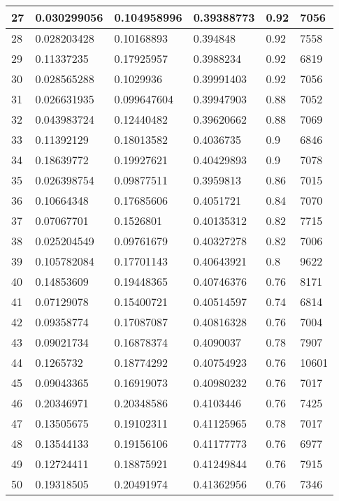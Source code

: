 \begin{longtable}{|l|l|l|l|l|l|}
27 & 0.030299056 & 0.104958996 & 0.39388773 & 0.92 & 7056 \\ \hline 
28 & 0.028203428 & 0.10168893 & 0.394848 & 0.92 & 7558 \\ \hline 
29 & 0.11337235 & 0.17925957 & 0.3988234 & 0.92 & 6819 \\ \hline 
30 & 0.028565288 & 0.1029936 & 0.39991403 & 0.92 & 7056 \\ \hline 
31 & 0.026631935 & 0.099647604 & 0.39947903 & 0.88 & 7052 \\ \hline 
32 & 0.043983724 & 0.12440482 & 0.39620662 & 0.88 & 7069 \\ \hline 
33 & 0.11392129 & 0.18013582 & 0.4036735 & 0.9 & 6846 \\ \hline 
34 & 0.18639772 & 0.19927621 & 0.40429893 & 0.9 & 7078 \\ \hline 
35 & 0.026398754 & 0.09877511 & 0.3959813 & 0.86 & 7015 \\ \hline 
36 & 0.10664348 & 0.17685606 & 0.4051721 & 0.84 & 7070 \\ \hline 
37 & 0.07067701 & 0.1526801 & 0.40135312 & 0.82 & 7715 \\ \hline 
38 & 0.025204549 & 0.09761679 & 0.40327278 & 0.82 & 7006 \\ \hline 
39 & 0.105782084 & 0.17701143 & 0.40643921 & 0.8 & 9622 \\ \hline 
40 & 0.14853609 & 0.19448365 & 0.40746376 & 0.76 & 8171 \\ \hline 
41 & 0.07129078 & 0.15400721 & 0.40514597 & 0.74 & 6814 \\ \hline 
42 & 0.09358774 & 0.17087087 & 0.40816328 & 0.76 & 7004 \\ \hline 
43 & 0.09021734 & 0.16878374 & 0.4090037 & 0.78 & 7907 \\ \hline 
44 & 0.1265732 & 0.18774292 & 0.40754923 & 0.76 & 10601 \\ \hline 
45 & 0.09043365 & 0.16919073 & 0.40980232 & 0.76 & 7017 \\ \hline 
46 & 0.20346971 & 0.20348586 & 0.4103446 & 0.76 & 7425 \\ \hline 
47 & 0.13505675 & 0.19102311 & 0.41125965 & 0.78 & 7017 \\ \hline 
48 & 0.13544133 & 0.19156106 & 0.41177773 & 0.76 & 6977 \\ \hline 
49 & 0.12724411 & 0.18875921 & 0.41249844 & 0.76 & 7915 \\ \hline 
50 & 0.19318505 & 0.20491974 & 0.41362956 & 0.76 & 7346 \\ \hline 
\end{longtable}